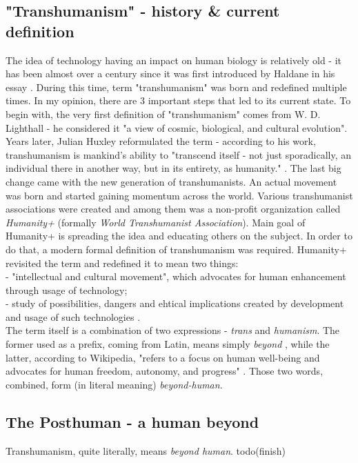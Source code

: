 \documentclass[12pt]{article}
\begin{document}
\subsection{"Transhumanism" - history \& current definition}
	The idea of technology having an impact on human biology is relatively old - it has been almost over a century since it was first introduced by Haldane in his essay \cite{haldane}. During this time, term "transhumanism" was born and redefined multiple times\cite{transhumanismEarlyThinking}. In my opinion, there are 3 important steps that led to its current state. To begin with, the very first definition of "transhumanism" comes from W. D. Lighthall - he considered it "a view of cosmic, biological, and cultural evolution"\cite{transhumanismHistoryLighthall}. Years later, Julian Huxley reformulated the term - according to his work, transhumanism is mankind's ability to "transcend itself - not just sporadically, an individual there in another way, but in its entirety, as humanity." \cite{transhumanismHistoryHuxley}. The last big change came with the new generation of transhumanists. An actual movement was born and started gaining momentum across the world. Various transhumanist associations were created and among them was a non-profit organization called \emph{Humanity+} (formally \emph{World Transhumanist Association}). Main goal of Humanity+ is spreading the idea and educating others on the subject. In order to do that, a modern formal definition of transhumanism was required. Humanity+ revisited the term and redefined it to mean two things: 
	\\- "intellectual and cultural movement", which advocates for human enhancement through usage of technology;
	\\- study of possibilities, dangers and ehtical implications created by development and usage of such technologies \cite{transhumanistFAQ:1}.
	\\The term itself is a combination of two expressions - \emph{trans} and \emph{humanism}. The former used as a prefix, coming from Latin, means simply \emph{beyond} \cite{transTermDictionary}, while the latter, according to Wikipedia, "refers to a focus on human well-being and advocates for human freedom, autonomy, and progress" \cite{humanismTermWiki}. Those two words, combined, form (in literal meaning) \emph{beyond-human}. 

\subsection{The Posthuman - a human beyond}
	Transhumanism, quite literally, means \emph{beyond human}. 
	todo(finish)
\end{document}
